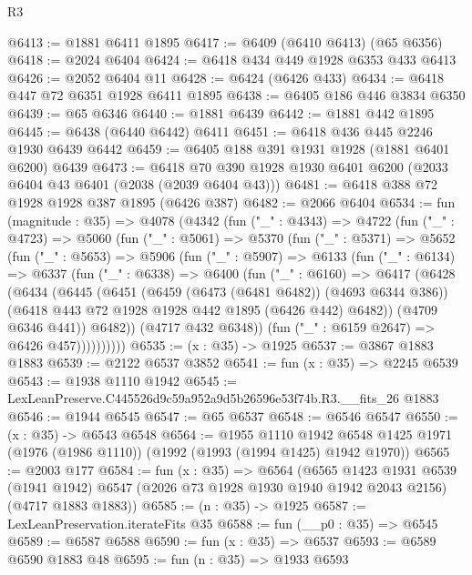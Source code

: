 \begin{lexlean}{R3}
\begin{coremodule}
@6413 := @1881 @6411 @1895
@6417 := @6409 (@6410 @6413) (@65 @6356)
@6418 := @2024 @6404
@6424 := @6418 @434 @449 @1928 @6353 @433 @6413
@6426 := @2052 @6404 @11
@6428 := @6424 (@6426 @433)
@6434 := @6418 @447 @72 @6351 @1928 @6411 @1895
@6438 := @6405 @186 @446 @3834 @6350
@6439 := @65 @6346
@6440 := @1881 @6439
@6442 := @1881 @442 @1895
@6445 := @6438 (@6440 @6442) @6411
@6451 := @6418 @436 @445 @2246 @1930 @6439 @6442
@6459 := @6405 @188 @391 @1931 @1928 (@1881 @6401 @6200) @6439
@6473 := @6418 @70 @390 @1928 @1930 @6401 @6200 (@2033 @6404 @43 @6401 (@2038 (@2039 @6404 @43)))
@6481 := @6418 @388 @72 @1928 @1928 @387 @1895 (@6426 @387)
@6482 := @2066 @6404
@6534 := fun (magnitude : @35) =>
  @4078
    (@4342
      (fun ("_" : @4343) =>
      @4722
        (fun ("_" : @4723) =>
        @5060
          (fun ("_" : @5061) =>
          @5370
            (fun ("_" : @5371) =>
            @5652
              (fun ("_" : @5653) =>
              @5906
                (fun ("_" : @5907) =>
                @6133
                  (fun ("_" : @6134) =>
                  @6337
                    (fun ("_" : @6338) =>
                    @6400
                      (fun ("_" : @6160) =>
                      @6417
                        (@6428
                          (@6434
                            (@6445
                              (@6451
                                (@6459 (@6473 (@6481 @6482)) (@4693 @6344 @386))
                                (@6418 @443 @72 @1928 @1928 @442 @1895 (@6426 @442) @6482))
                              (@4709 @6346 @441))
                            @6482))
                        (@4717 @432 @6348))
                      (fun ("_" : @6159 @2647) => @6426 @457))))))))))
@6535 := (x : @35) -> @1925
@6537 := @3867 @1883 @1883
@6539 := @2122 @6537 @3852
@6541 := fun (x : @35) => @2245 @6539
@6543 := @1938 @1110 @1942
@6545 := LexLeanPreserve.C445526d9c59a952a9d5b26596e53f74b.R3.__fits_26 @1883
@6546 := @1944 @6545
@6547 := @65 @6537
@6548 := @6546 @6547
@6550 := (x : @35) -> @6543 @6548
@6564 := @1955
    @1110
    @1942
    @6548
    @1425
    @1971
    (@1976 (@1986 @1110))
    (@1992 (@1993 (@1994 @1425) @1942 @1970))
@6565 := @2003 @177
@6584 := fun (x : @35) =>
  @6564
    (@6565
      @1423
      @1931
      @6539
      (@1941 @1942)
      @6547
      (@2026 @73 @1928 @1930 @1940 @1942 @2043 @2156)
      (@4717 @1883 @1883))
@6585 := (n : @35) -> @1925
@6587 := LexLeanPreservation.iterateFits @35
@6588 := fun (__p0 : @35) => @6545
@6589 := @6587 @6588
@6590 := fun (x : @35) => @6537
@6593 := @6589 @6590 @1883 @48
@6595 := fun (n : @35) => @1933 @6593

\end{coremodule}
\end{lexlean}

